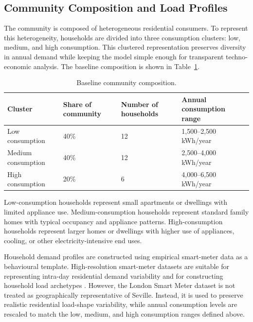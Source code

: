 \subsection{Community Composition and Load Profiles}
\label{sec:community_composition_load_profiles}

The community is composed of heterogeneous residential consumers. To represent this heterogeneity, households are divided into three consumption clusters: low, medium, and high consumption. This clustered representation preserves diversity in annual demand while keeping the model simple enough for transparent techno-economic analysis. The baseline composition is shown in Table~\ref{tab:ch3_baseline_community_composition}.

\begin{table}[htbp]
\centering
\caption{Baseline community composition.}
\label{tab:ch3_baseline_community_composition}
\begin{tabular}{p{}p{}p{}p{}}
\toprule
\textbf{Cluster} & \textbf{Share of community} & \textbf{Number of households} & \textbf{Annual consumption range} \\
\midrule
Low consumption & 40\% & 12 & 1,500--2,500 kWh/year \\
Medium consumption & 40\% & 12 & 2,500--4,000 kWh/year \\
High consumption & 20\% & 6 & 4,000--6,500 kWh/year \\
\bottomrule
\end{tabular}
\end{table}

Low-consumption households represent small apartments or dwellings with limited appliance use. Medium-consumption households represent standard family homes with typical occupancy and appliance patterns. High-consumption households represent larger homes or dwellings with higher use of appliances, cooling, or other electricity-intensive end uses.

Household demand profiles are constructed using empirical smart-meter data as a behavioural template. High-resolution smart-meter datasets are suitable for representing intra-day residential demand variability and for constructing household load archetypes \cite{f2015f}. However, the London Smart Meter dataset is not treated as geographically representative of Seville. Instead, it is used to preserve realistic residential load-shape variability, while annual consumption levels are rescaled to match the low, medium, and high consumption ranges defined above.


